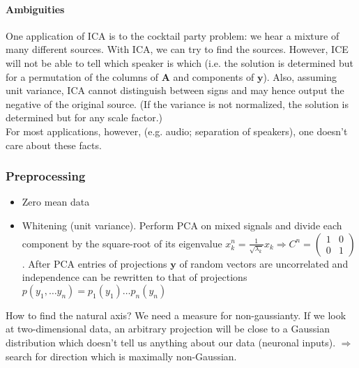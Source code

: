 \documentclass[11pt]{article}
\begin{document}
\paragraph{Ambiguities}
One application of ICA is to the cocktail party problem: we hear a mixture of many different sources. With ICA, we can try to find the sources. However, ICE will not be able to tell which speaker is which (i.e. the solution is determined but for a permutation of the columns of $\mathbf{A}$ and components of $\mathbf{y}$). Also, assuming unit variance, ICA cannot distinguish between signs and may hence output the negative of the original source. (If the variance is not normalized, the solution is determined but for any scale factor.)
\\ For most applications, however, (e.g. audio; separation of speakers), one doesn't care about these facts.

\subsubsection{Preprocessing} 
\begin{itemize}
\item Zero mean data
\item Whitening (unit variance). Perform PCA on mixed signals and divide each component by the square-root of its eigenvalue $x_k^n=\frac{1}{\sqrt{\lambda_k}}x_k \Rightarrow C^n=\begin{pmatrix}1 & 0 \\ 0 & 1\end{pmatrix}$. After PCA entries of projections $\mathbf{y}$ of random vectors are uncorrelated and independence can be rewritten to that of projections $p(y_1,\dots y_n)=p_1(y_1)\dots p_n(y_n)$
\end{itemize}
How to find the natural axis? We need a measure for non-gaussianty.
If we look at two-dimensional data, an arbitrary projection will be close to a Gaussian distribution which doesn't tell us anything about our data (neuronal inputs). $\Rightarrow$ search for direction which is maximally non-Gaussian.\\
\end{document}
